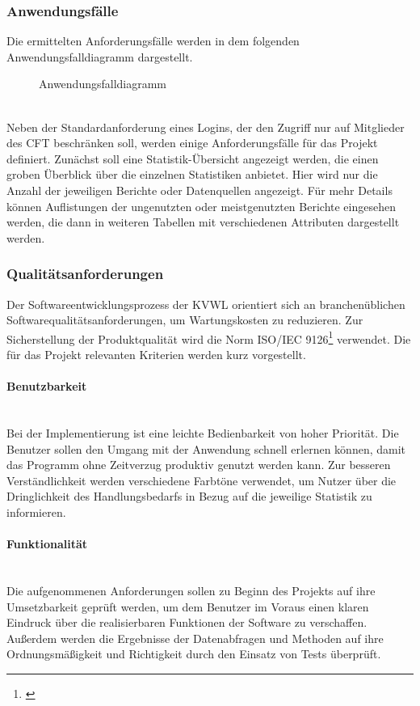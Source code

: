 \subsubsection{Anwendungsfälle}\label{sec:Anwendungsfaelle}
Die ermittelten Anforderungsfälle werden in dem folgenden Anwendungsfalldiagramm dargestellt.
\begin{figure}[htb]
	\centering
	\caption{Anwendungsfalldiagramm}
	\label{fig:Anwendungsfalldiagramm}
\end{figure}\\
Neben der Standardanforderung eines Logins, der den Zugriff nur auf Mitglieder des \ac{CFT} \teamName beschränken soll, werden einige Anforderungsfälle für das Projekt definiert. Zunächst soll eine Statistik-Übersicht angezeigt werden, die einen groben Überblick über die einzelnen Statistiken anbietet. Hier wird nur die Anzahl der jeweiligen Berichte oder Datenquellen angezeigt. Für mehr Details können Auflistungen \zB der ungenutzten oder meistgenutzten Berichte eingesehen werden, die dann in weiteren Tabellen mit verschiedenen Attributen dargestellt werden.

\subsubsection{Qualitätsanforderungen}\label{sec:Qualitaetsanforderungen}
Der Softwareentwicklungsprozess der \ac{KVWL} orientiert sich an branchenüblichen Softwarequalitätsanforderungen, um Wartungskosten zu reduzieren. Zur Sicherstellung der Produktqualität wird die Norm ISO/IEC 9126\footnote{\cite{ISO9126}} verwendet. Die für das Projekt relevanten Kriterien werden kurz vorgestellt.

\paragraph{Benutzbarkeit}~\\\label{p:Benutzbarkeit}
Bei der Implementierung ist eine leichte Bedienbarkeit von hoher Priorität. Die Benutzer sollen den Umgang mit der Anwendung schnell erlernen können, damit das Programm ohne Zeitverzug produktiv genutzt werden kann. Zur besseren Verständlichkeit werden verschiedene Farbtöne verwendet, um Nutzer über die Dringlichkeit des Handlungsbedarfs in Bezug auf die jeweilige Statistik zu informieren.

\paragraph{Funktionalität}~\\\label{p:Funktionalitaet}
Die aufgenommenen Anforderungen sollen zu Beginn des Projekts auf ihre Umsetzbarkeit geprüft werden, um dem Benutzer im Voraus einen klaren Eindruck über die realisierbaren Funktionen der Software zu verschaffen. Außerdem werden die Ergebnisse der Datenabfragen und Methoden auf ihre Ordnungsmäßigkeit und Richtigkeit durch den Einsatz von Tests überprüft.

